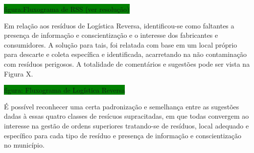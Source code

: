 	\colorbox{green}{figura:Fluxograma de RSS (ver resolução)}
	
	Em relação aos resíduos de Logística Reversa, identificou-se como faltantes a presença de informação e conscientização e o interesse dos fabricantes e consumidores. A solução para tais, foi relatada com base em um local próprio para descarte e coleta específica e identificada, acarretando na não contaminação com resíduos perigosos. A totalidade de comentários e sugestões pode ser vista na Figura X.
	
	\colorbox{green}{figura: Fluxograma de Logística Reversa}

	É possível reconhecer uma certa padronização e semelhança entre as sugestões dadas à essas quatro classes de resícuos supracitadas, em que todas convergem ao interesse na gestão de ordens superiores tratando-se de resíduos, local adequado e específico para cada tipo de resíduo e presença de informação e conscientização no município.
